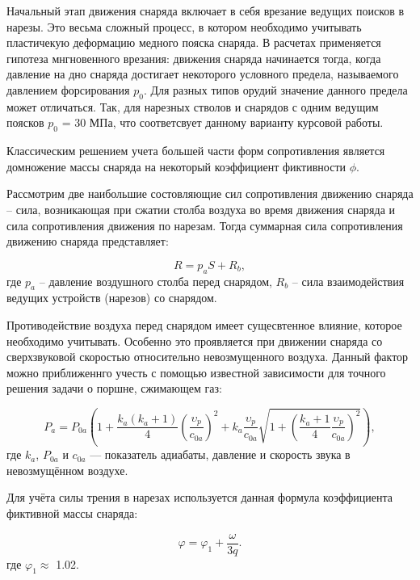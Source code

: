 \documentclass[14pt, a4paper]{report} %
\begin{document}
Начальный этап движения снаряда включает в себя врезание ведущих поисков в нарезы. Это весьма сложный процесс, в котором необходимо учитывать пластичекую деформацию медного пояска снаряда. В расчетах применяется гипотеза мнгновенного врезания: движения снаряда начинается тогда, когда давление на дно снаряда достигает 
некоторого условного предела, называемого давлением форсирования $p_0$. Для разных типов орудий значение данного предела может отличаться. Так, для нарезных стволов и снарядов с одним ведущим поясков $p_0$ = 30 МПа, что соответсвует данному варианту курсовой работы.

Классическим решением учета большей части форм сопротивления является домножение массы снаряда на некоторый коэффициент фиктивности $\phi$.

Рассмотрим две наибольшие состовляющие сил сопротивления движению снаряда -- сила, возникающая при сжатии столба воздуха во время движения снаряда и сила сопротивления движения по нарезам. Тогда суммарная сила сопротивления
движению снаряда представляет: 

\begin{equation}
R = p_a S + R_b,
\end{equation}
где $p_a$ -- давление воздушного столба перед снарядом, $R_b$ -- сила взаимодействия ведущих устройств (нарезов)
со снарядом.

Противодействие воздуха перед снарядом имеет сущесвтенное влияние, которое необходимо учитывать. Особенно это проявляется при движении снаряда 
со сверхзвуковой скоростью относительно невозмущенного воздуха. Данный фактор можно приближеннго учесть с помощью известной зависимости для точного решения задачи о поршне, сжимающем газ:

\begin{equation}
P_a = P_{0a} \left(1 + \frac{k_a(k_a+1)}{4} \left(\frac{\upsilon_p}{c_{0a}}\right)^2 + 
k_a \frac{\upsilon_p}{c_{0a}} \sqrt{1 + \left(\frac{k_a+1}{4} \frac{\upsilon_p}{c_{0a}}\right)^2} \right),
\end{equation}
где $k_a$, $P_{0a}$ и $c_{0a}$ — показатель адиабаты, давление и скорость звука в невозмущённом воздухе.

Для учёта силы трения в нарезах используется данная формула коэффициента фиктивной массы снаряда: 

\begin{equation}
\varphi = \varphi_1 + \frac{\omega}{3q}.
\label{eq:phi_equation}
\end{equation}
где $\varphi_1 \approx$  1.02.
\end{document}
